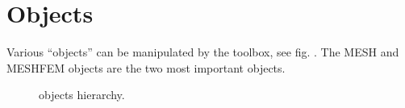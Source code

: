 \documentclass[a4paper,11pt,english]{sphinxmanual}
\begin{document}
\section{Objects}
\label{\detokenize{matlab_octave/mlabgf:objects}}
Various “objects” can be manipulated by the  toolbox, see fig.
{\hyperref[\detokenize{matlab_octave/mlabgf:malb-fig-hierarchy}]{}}. The MESH and MESHFEM objects are the two most
important objects.

\begin{figure}[htbp]
\centering
\capstart

\noindent{}
\caption{ objects hierarchy.}\label{\detokenize{matlab_octave/mlabgf:id1}}\label{\detokenize{matlab_octave/mlabgf:malb-fig-hierarchy}}\end{figure}
\end{document}
